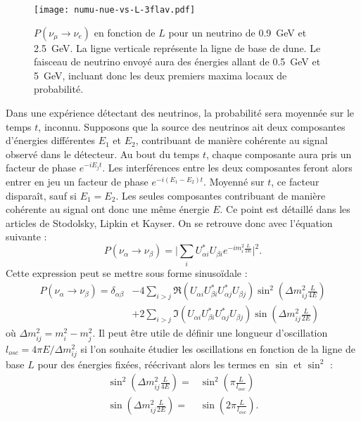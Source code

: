         \begin{figure}[!htb]
          \centering
          \texttt{[image: numu-nue-vs-L-3flav.pdf]}
          \caption[$P(\nu_{\mu}\to\nu_e)$ en fonction de $L$]{\label{fig::3flavors_oscillations}$P(\nu_{\mu}\to\nu_e)$ en fonction de $L$ pour un neutrino de \SI{0.9}{\giga\electronvolt} et \SI{2.5}{\giga\electronvolt}. La ligne verticale représente la ligne de base de \gls{dune}. Le faisceau de neutrino envoyé aura des énergies allant de \SI{0.5}{\giga\electronvolt} et \SI{5}{\giga\electronvolt}, incluant donc les deux premiers maxima locaux de probabilité.}
        \end{figure}
        Dans une expérience détectant des neutrinos, la probabilité sera moyennée sur le temps $t$, inconnu. Supposons que la source des neutrinos ait deux composantes d'énergies différentes $E_1$ et $E_2$, contribuant de manière cohérente au signal observé dans le détecteur. Au bout du temps $t$, chaque composante aura pris un facteur de phase $e^{-iE_jt}$. Les interférences entre les deux composantes feront alors entrer en jeu un facteur de phase $e^{-i(E_1-E_2)t}$. Moyenné sur $t$, ce facteur disparaît, sauf si $E_1 = E_2$. Les seules composantes contribuant de manière cohérente au signal ont donc une même énergie $E$. Ce point est détaillé dans les articles de Stodolsky\cite{Stodolsky1998}, Lipkin\cite{Lipkin2005} et Kayser\cite{Kayser2005}. On se retrouve donc avec l'équation suivante : 
        \begin{equation*}
          P(\nu_{\alpha}\to\nu_{\beta}) = \bigg|\sum_i U_{\alpha i}^*U_{\beta i} e^{-im_i^2\frac{L}{2E}}\bigg|^2.
        \end{equation*}
        Cette expression peut se mettre sous forme sinusoïdale\cite{Mondal2015} :
        \begin{equation}\label{eq::proba_oscillation}
          \begin{split}
            P(\nu_{\alpha}\to\nu_{\beta}) = \delta_{\alpha\beta} & - 4\sum_{i>j}\Re(U_{\alpha i}U_{\beta i}^*U_{\alpha j}^*U_{\beta j})\sin^2\left(\Delta m_{ij}^2\frac{L}{4E}\right) \\
            & +2\sum_{i>j}\Im(U_{\alpha i}U_{\beta i}^*U_{\alpha j}^*U_{\beta j})\sin\left(\Delta m_{ij}^2\frac{L}{2E}\right)
          \end{split}
        \end{equation}
        où $\Delta m_{ij}^2 = m_i^2-m_j^2$. Il peut être utile de définir une longueur d'oscillation $l_{osc} = 4\pi E/\Delta m_{ij}^2$ si l'on souhaite étudier les oscillations en fonction de la ligne de base $L$ pour des énergies fixées, réécrivant alors les termes en $\sin$ et $\sin^2$ :
        \begin{eqnarray}
          \sin^2\left(\Delta m_{ij}^2\frac{L}{4E}\right) = &  \sin^2\left(\pi\frac{L}{l_{osc}}\right) \\
          \sin\left(\Delta m_{ij}^2\frac{L}{2E}\right) = & \sin\left(2\pi\frac{L}{l_{osc}}\right).
        \end{eqnarray}
        
